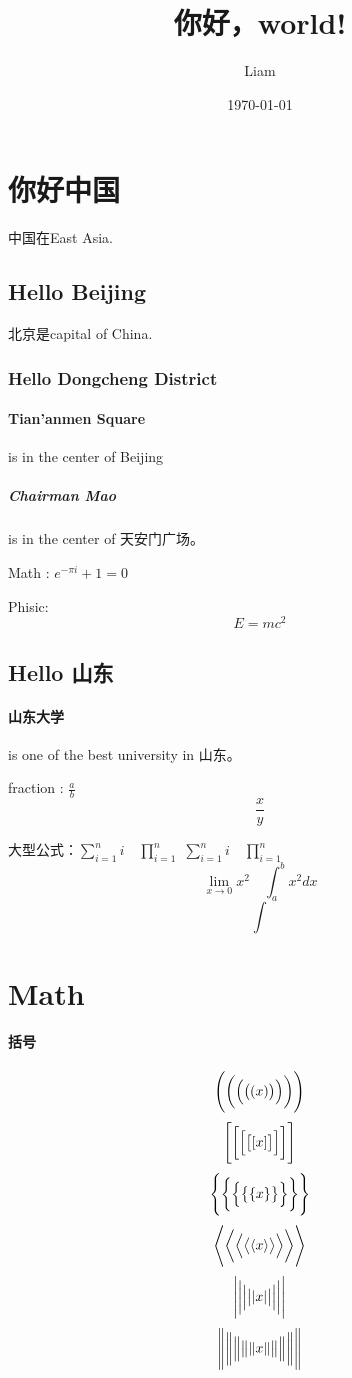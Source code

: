 \documentclass[UTF8]{ctexart}
\title{你好，world!}
\author{Liam}
\date{\today}
\begin{document}
\maketitle
\tableofcontents
\section{你好中国}
中国在East Asia.
\subsection{Hello Beijing}
北京是capital of China.
\subsubsection{Hello Dongcheng District}
\paragraph{Tian'anmen Square}
is in the center of Beijing
\subparagraph{Chairman Mao}
is in the center of 天安门广场。

Math : $e^{-\pi i}+1=0$

Phisic:
\[E=mc^2\]
\subsection{Hello 山东}
\paragraph{山东大学} is one of the best university in 山东。

fraction : $\frac{a}{b}$
\[\frac{x}{y}\]

大型公式：$ \sum_{i=1}^n i\quad \prod_{i=1}^n $
$ \sum\limits _{i=1}^n i\quad \prod\limits _{i=1}^n $
\[ \lim_{x\to0}x^2 \quad \int_a^b x^2 dx \]
\[ \int \]

\section{Math}
\paragraph{括号}
\[ \Biggl(\biggl(\Bigl(\bigl((x)\bigr)\Bigr)\biggr)\Biggr) \]
\[ \Biggl[\biggl[\Bigl[\bigl[[x]\bigr]\Bigr]\biggr]\Biggr] \]
\[ \Biggl \{\biggl \{\Bigl \{\bigl \{\{x\}\bigr \}\Bigr \}\biggr \}\Biggr\} \]
\[ \Biggl\langle\biggl\langle\Bigl\langle\bigl\langle\langle x
\rangle\bigr\rangle\Bigr\rangle\biggr\rangle\Biggr\rangle \]
\[ \Biggl\lvert\biggl\lvert\Bigl\lvert\bigl\lvert\lvert x
\rvert\bigr\rvert\Bigr\rvert\biggr\rvert\Biggr\rvert \]
\[ \Biggl\lVert\biggl\lVert\Bigl\lVert\bigl\lVert\lVert x
\rVert\bigr\rVert\Bigr\rVert\biggr\rVert\Biggr\rVert \]
\end{document}
